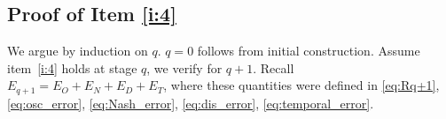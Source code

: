 \documentclass[12pt,reqno,letterpaper]{amsart}
\numberwithin{equation}{section}
\newcommand{\1}{{\bf 1}}
\newcommand{\2}{{\bf 2}}
\theoremstyle{remark}
\theoremstyle{remark}
\begin{document}





\subsection{Proof of Item \ref{i:4}}

We argue by induction on $q$. $q = 0$ follows from initial construction. Assume item~\ref{i:4} holds at stage $q$, we verify for $q +1$. Recall $E_{q + 1} = E_O + E_N + E_D + E_T$, where these quantities were defined in \eqref{eq:Rq+1}, \eqref{eq:osc_error}, \eqref{eq:Nash_error}, \eqref{eq:dis_error}, \eqref{eq:temporal_error}.
\end{document}
